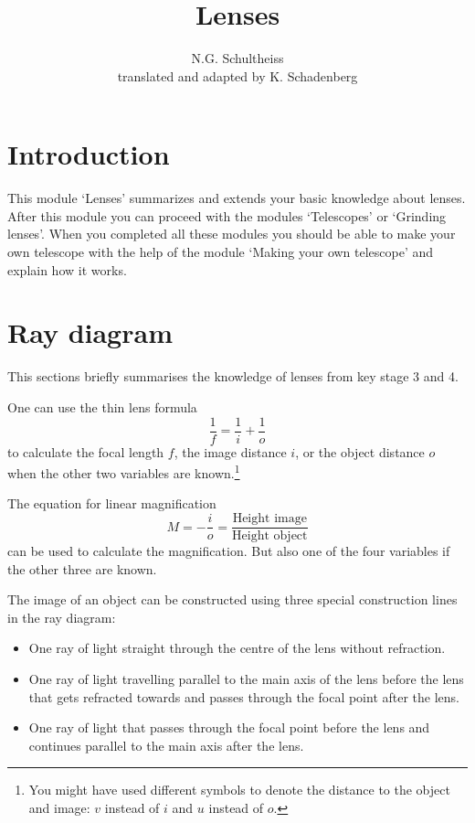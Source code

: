 


\author{N.G. Schultheiss \\ translated and adapted by K. Schadenberg}
\date{}
\title{Lenses}



\maketitle

\section{Introduction}
This module `Lenses' summarizes and extends your basic knowledge about lenses. After this module you can proceed with the modules `Telescopes' or `Grinding lenses'. When you completed all these modules you should be able to make your own telescope with the help of the module `Making your own telescope' and explain how it works.

\section{Ray diagram}
This sections briefly summarises the knowledge of lenses from key stage 3 and 4.

One can use the thin lens formula
\begin{equation}
\frac{1}{f}=\frac{1}{i}+\frac{1}{o} \label{eg:lens_equation}
\end{equation}
to calculate the focal length $f$, the image distance $i$, or the object distance $o$ when the other two variables are known.\footnote{You might have used different symbols to denote the distance to the object and image: $v$ instead of $i$ and $u$ instead of $o$.}

The equation for linear magnification
\begin{equation}
M = - \frac{i}{o} = \frac{\mbox{Height image}}{\mbox{Height object}}
\end{equation}
can be used to calculate the magnification. But also one of the four variables if the other three are known.

The image of an object can be constructed using three special construction lines in the ray diagram:
\begin{itemize}
\item One ray of light straight through the centre of the lens without refraction.
\item One ray of light travelling parallel to the main axis of the lens before the lens that gets refracted towards and passes through the focal point after the lens.
\item One ray of light that passes through the focal point before the lens and continues parallel to the main axis after the lens.
\end{itemize}

